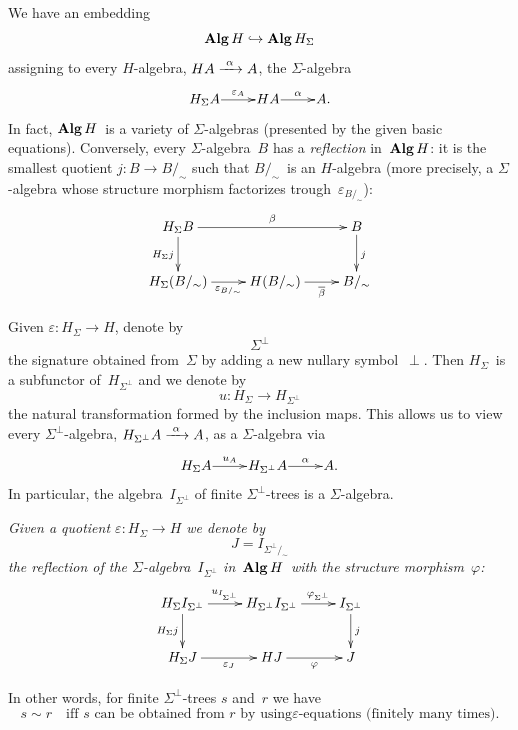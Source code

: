 \documentclass{entcs}
\DeclareMathOperator{\Alg}{\textnormal{\textbf{Alg}}}
\newenvironment{pv}[1]{\begin{trivlist}
\item[\hspace{\labelsep}\normalfont\bfseries#1]}%
{\end{trivlist}}
\begin{document}
\begin{pv}{2.5 Remark}
We have an embedding
\[\Alg H\hookrightarrow\Alg H_\Sigma\]
assigning to every $H$-algebra,
$HA\xrightarrow{\rule{1mm}{0mm}\alpha\rule{1mm}{0mm}}A$, the
$\Sigma$-algebra
\[
\xy
\xymatrix@1{
H_\Sigma A
\ar[0,1]^-{\varepsilon_A}
&
HA
\ar[0,1]^-{\alpha}
&
A.
}
\endxy
\]
In fact, $\Alg H$~is a variety of $\Sigma$-algebras (presented by
the given basic equations). Conversely, every $\Sigma$-algebra~$B$
has a \textit{reflection} in~$\Alg H$: it is the smallest quotient
$j\colon B\to B/_\sim$ such that $B/_\sim$~is an $H$-algebra (more
precisely, a $\Sigma$-algebra whose structure morphism factorizes
trough~$\varepsilon_{B/_\sim}$):\vspace{3mm}
\[
\xy
\xymatrix{
H_\Sigma B
\ar[0,2]^-{\beta}
\ar[1,0]_{H_\Sigma j}
&
&
B
\ar[1,0]^{j}
\\
H_\Sigma(B/_\sim)
\ar[0,1]_-{\varepsilon_{B/_\sim}}
&
H(B/_\sim)
\ar[0,1]_-{\overline{\beta}}
&
B/_\sim
}
\endxy
\]\vspace{1mm}
\end{pv}

\begin{pv}{2.6 Notation}
Given $\varepsilon\colon H_\Sigma\to H$, denote by
\[\Sigma^\perp\]
the signature obtained from~$\Sigma$ by adding a new nullary
symbol~$\perp$. Then $H_\Sigma$~is a subfunctor of~$H_{\Sigma^\perp}$
and we denote by
\[u\colon H_\Sigma\to H_{\Sigma^\perp}\]
the natural transformation formed by the inclusion maps. This allows
us to view every $\Sigma^\perp$-algebra,
$H_{\Sigma^\perp}A\xrightarrow{\rule{1mm}{0mm}\alpha\rule{1mm}{0mm}}A$,
as a $\Sigma$-algebra via
\[
\xy
\xymatrix@1{
H_\Sigma A
\ar[0,1]^-{u_A}
&
H_{\Sigma^\perp}A
\ar[0,1]^-{\alpha}
&
A.
}
\endxy
\]
In particular, the algebra~$I_{\Sigma^\perp}$ of finite
$\Sigma^\perp$-trees is a $\Sigma$-algebra.
\end{pv}

\begin{pv}{Definition}
\itshape
Given a quotient $\varepsilon\colon H_\Sigma\to H$ we denote by
\[J=I_{\Sigma^\perp/_\sim}\]
the reflection of the $\Sigma$-algebra~$I_{\Sigma^\perp}$
in~$\Alg H$\ with the structure morphism~$\varphi$:\vspace{3.5mm}
\[
\xy
\xymatrix{
H_\Sigma I_{\Sigma^\perp}
\ar[0,1]^-{u_{I_{\Sigma^\perp}}}
\ar[1,0]_{H_\Sigma j}
&
H_{\Sigma^\perp}I_{\Sigma^\perp}
\ar[0,1]^-{\varphi_{\Sigma^\perp}}
&
I_{\Sigma^\perp}
\ar[1,0]^{j}
\\
H_\Sigma J
\ar[0,1]_-{\varepsilon_J}
&
HJ
\ar[0,1]_-{\varphi}
&
J
}
\endxy
\]\vspace{.5mm}

\noindent
In other words, for finite $\Sigma^\perp$-trees $s$ and~$r$ we have
\[s\sim r\quad \text{iff $s$ can be obtained from $r$ by using
$\varepsilon$-equations (finitely many times).}\]
\end{pv}
\end{document}
